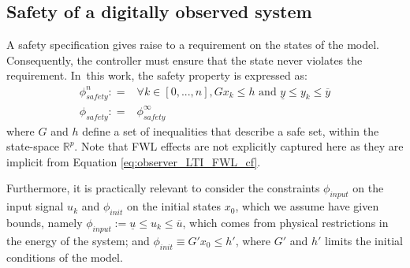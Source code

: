 \documentclass[sigconf]{llncs}
\newcommand{\mat}[1]{{#1}}
\renewcommand{\vec}[1]{{#1}}
\begin{document}
\subsection{Safety of a digitally observed system}\label{sec:cof_safety}
A safety specification gives raise to a requirement on the states of
the model. Consequently, the controller must ensure that the state
never violates the requirement.  In~this work, the safety property is
expressed as:
%
\begin{align}
\phi_\mathit{safety}^n: = & \forall k \in [0, ... , n], \mat{G}\vec{x}_k \leq \vec{h} \text{ and } \underline{y} \leq y_k \leq \overline{y}\nonumber\\
\phi_\mathit{safety}: = & \phi_\mathit{safety}^\infty
\label{eq:safetyspec}
\end{align}
%
where $\mat{G}$ and $\vec{h}$ define a set of inequalities that describe 
a safe set, within the state-space $\mathbb{R}^p$.
%
Note that FWL effects are not explicitly captured here
as they are implicit from Equation \ref{eq:observer_LTI_FWL_cf}.

Furthermore, it is practically relevant to consider the 
constraints $\phi_\mathit{input}$ on the input
signal $u_{k}$ and $\phi_\mathit{init}$ on the initial states $x_0$,
which we assume have given bounds, namely 
$\phi_\mathit{input} := \underline{u} \leq u_k \leq \overline{u}$, 
which comes from physical restrictions in the energy of the system; and
$\phi_\mathit{init}\equiv \mat{G}' \vec{x}_0 \leq \vec{h}'$,
where $\mat{G}'$ and $\vec{h}'$ limits the initial conditions of the model. 

%
%
\end{document}
